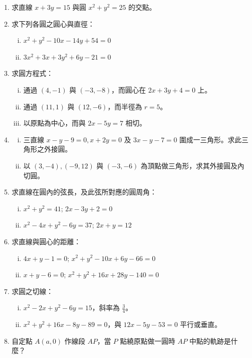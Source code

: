 \begin{enumerate}
  \item 求直線 $x + 3y = 15$ 與圓 $x^2 + y^2 = 25$ 的交點。

  \item 求下列各圓之圓心與直徑：
  \begin{enumerate}[(i)]
    \item $x^2 + y^2 - 10x - 14y + 54 = 0$
    \item $3x^2 + 3x + 3y^2 + 6y - 21 = 0$
  \end{enumerate}

  \item 求圓方程式：
  \begin{enumerate}[(i)]
    \item 通過 $(4, -1)$ 與 $(-3, -8)$，而圓心在 $2x + 3y + 4 = 0$ 上。
    \item 通過 $(11, 1)$ 與 $(12, -6)$，而半徑為 $r = 5$。
    \item 以原點為中心，而與 $2x - 5y = 7$ 相切。
  \end{enumerate}

  \item
  \begin{enumerate}[(i)]
    \item 三直線 $x - y - 9 = 0, x + 2y = 0$ 及 $3x - y - 7 = 0$ 圍成一三角形。求此三角形之外接圓。
    \item 以 $(3, -4), (-9, 12)$ 與 $(-3, -6)$ 為頂點做三角形，求其外接圓及內切圓。
  \end{enumerate}

  \item[*\theenumi.] 求直線在圓內的弦長，及此弦所對應的圓周角：
  \begin{enumerate}[(i)]
    \item $x^2 + y^2 = 41$; $2x - 3y + 2 = 0$
    \item $x^2 - 4x + y^2 - 6y = 37$; $2x + y = 12$
  \end{enumerate}

  \item 求直線與圓心的距離：
  \begin{enumerate}[(i)]
    \item $4x + y - 1 = 0$; $x^2 + y^2 - 10x + 6y - 66 = 0$
    \item $x + y - 6 = 0$; $x^2 + y^2 + 16x + 28y - 140 = 0$
  \end{enumerate}

  \item 求圓之切線：
  \begin{enumerate}[(i)]
    \item $x^2 - 2x + y^2 - 6y = 15$，斜率為 $\frac{3}{4}$。
    \item $x^2 + y^2 + 16x - 8y - 89 = 0$，與 $12x - 5y - 53 = 0$ 平行或垂直。
  \end{enumerate}

  \item 自定點 $A(a,0)$ 作線段 $AP$，當 $P$ 點繞原點做一圓時 $AP$ 中點的軌跡是什麼？
\end{enumerate}

